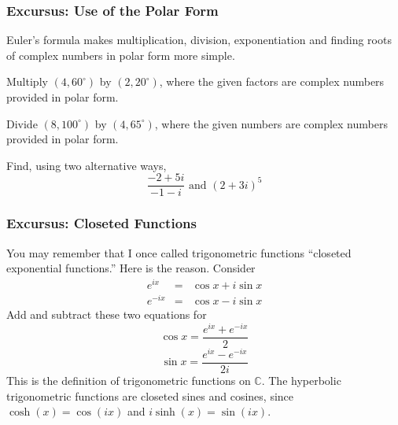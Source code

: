 \documentclass[xcolor=dvipsnames]{beamer}
\begin{document}
\begin{frame}
  \frametitle{Excursus: Use of the Polar Form}
Euler's formula makes multiplication, division, exponentiation and
finding roots of complex numbers in polar form more simple.

\medskip

{\ubung} Multiply $(4,60^{\circ})$ by $(2,20^{\circ})$, where the
given factors are complex numbers provided in polar form.

\medskip

{\ubung} Divide $(8,100^{\circ})$ by $(4,65^{\circ})$, where the
given numbers are complex numbers provided in polar form.

\medskip

{\ubung} Find, using two alternative ways,
\begin{equation}
  \label{eq:iekaekep}
  \frac{-2+5i}{-1-i}\mbox{ and }\left(2+3i\right)^{5}
\end{equation}
\end{frame}

\begin{frame}
  \frametitle{Excursus: Closeted Functions}
You may remember that I once called trigonometric functions ``closeted
exponential functions.'' Here is the reason. Consider
\begin{equation}
  \label{eq:eixeivei}
  \begin{array}{rcl}
  e^{ix}&=&\cos{}x+i\sin{}x \\
  e^{-ix}&=&\cos{}x-i\sin{}x
  \end{array}
\end{equation}
Add and subtract these two equations for
\begin{equation}
  \label{eq:ohrayaxu}
  \cos{}x=\frac{e^{ix}+e^{-ix}}{2}
\end{equation}
\begin{equation}
  \label{eq:quuiquei}
  \sin{}x=\frac{e^{ix}-e^{-ix}}{2i}
\end{equation}
This is the definition of trigonometric functions on $\mathbb{C}$. The
hyperbolic trigonometric functions are closeted sines and cosines,
since $\cosh(x)=\cos(ix)$ and $i\sinh(x)=\sin(ix)$. 
\end{frame}
\end{document}
